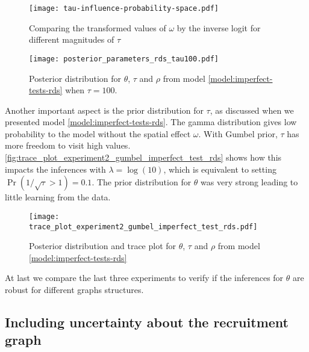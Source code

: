 \begin{figure}
  \centering
  \caption{\label{fig:tau-influence-probability-space}Comparing
  the transformed values of $\omega$ by the inverse logit for different
  magnitudes of $\tau$}
  \texttt{[image: tau-influence-probability-space.pdf]}
\end{figure}

\begin{figure}
  \centering
  \caption{\label{fig:posterior_parameters_rds_tau100}Posterior distribution
  for $\theta$, $\tau$ and $\rho$ from model \eqref{model:imperfect-tests-rds}
  when $\tau = 100$.}
  \texttt{[image: posterior\_parameters\_rds\_tau100.pdf]}
\end{figure}

Another important aspect is the prior distribution for $\tau$, as discussed
when we presented model \eqref{model:imperfect-tests-rds}. The gamma
distribution gives low probability to the model without the spatial effect
$\omega$. With Gumbel prior, $\tau$ has more freedom to visit high values.
\autoref{fig:trace_plot_experiment2_gumbel_imperfect_test_rds} shows how this
impacts the inferences with $\lambda = \log(10)$, which is equivalent to setting
$\Pr(1/\sqrt{\tau} > 1) = 0.1$. The prior distribution for $\theta$ was very
strong leading to little learning from the data. 

\begin{figure}
  \centering
  \caption{\label{fig:trace_plot_experiment2_gumbel_imperfect_test_rds}Posterior
  distribution and trace plot for $\theta$, $\tau$ and $\rho$ from model 
  \eqref{model:imperfect-tests-rds}}
  \texttt{[image: trace\_plot\_experiment2\_gumbel\_imperfect\_test\_rds.pdf]}
\end{figure}

At last we compare the last three experiments to verify if the inferences for
$\theta$ are robust for different graphs structures. 

\subsection{Including uncertainty about the recruitment graph}




